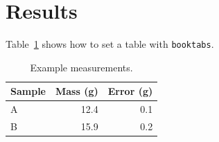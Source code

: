 \section{Results}

Table~\ref{tab:example} shows how to set a table with \texttt{booktabs}.

\begin{table}[h]
  \centering
  \begin{tabular}{lrr}
    \toprule
    Sample & Mass (g) & Error (g) \\
    \midrule
    A & 12.4 & 0.1 \\
    B & 15.9 & 0.2 \\
    \bottomrule
  \end{tabular}
  \caption{Example measurements.}
  \label{tab:example}
\end{table}
